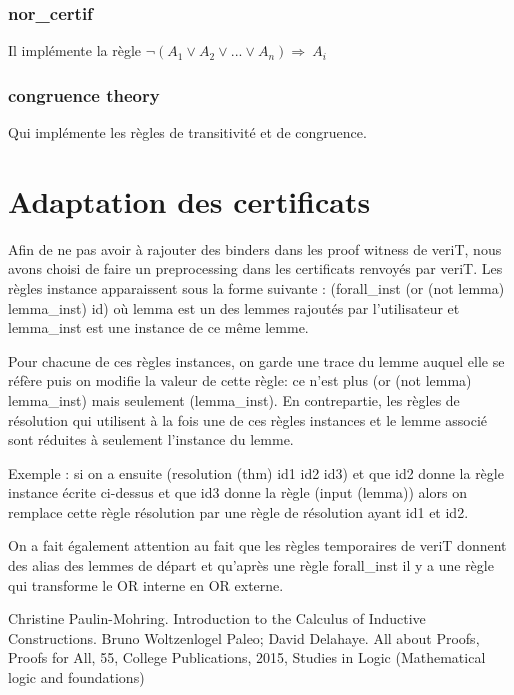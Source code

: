 \documentclass{article}
\begin{document}
\subsubsection{nor\_certif}
Il implémente la règle $\neg (A_1 \vee A_2 \vee ... \vee A_n) \Rightarrow ~A_i$

\subsubsection{congruence theory}
Qui implémente les règles de transitivité et de congruence.







\section{Adaptation des certificats}

Afin de ne pas avoir à rajouter des binders dans les proof witness de veriT, nous avons choisi de faire un
preprocessing dans les certificats renvoyés par veriT.
Les règles instance apparaissent sous la forme suivante :
     (forall\_inst (or (not lemma) lemma\_inst) id)
où lemma est un des lemmes rajoutés par l'utilisateur et lemma\_inst est une instance de ce même lemme.

Pour chacune de ces règles instances, on garde une trace du lemme auquel elle se réfère puis on modifie la valeur
de cette règle: ce n'est plus (or (not lemma) lemma\_inst) mais seulement (lemma\_inst). En contrepartie, les règles
de résolution qui utilisent à la fois une de ces règles instances et le lemme associé sont réduites à seulement
l'instance du lemme.

Exemple :
si on a ensuite
(resolution (thm) id1 id2 id3)
et que id2 donne la règle instance écrite ci-dessus et que id3 donne la règle
(input (lemma))
alors on remplace cette règle résolution par une règle de résolution ayant id1 et id2.

On a fait également attention au fait que les règles temporaires de veriT donnent des alias des lemmes de départ
et qu'après une règle forall\_inst il y a une règle qui transforme le OR interne en OR externe.

\renewcommand\refname{Bibliographie
}
\begin{thebibliography}{9}
Christine Paulin-Mohring. Introduction to the Calculus of Inductive Constructions. Bruno Woltzenlogel Paleo; David Delahaye. All about Proofs, Proofs for All, 55, College Publications, 2015, Studies in Logic (Mathematical logic and foundations)

\end{thebibliography}
\end{document}
